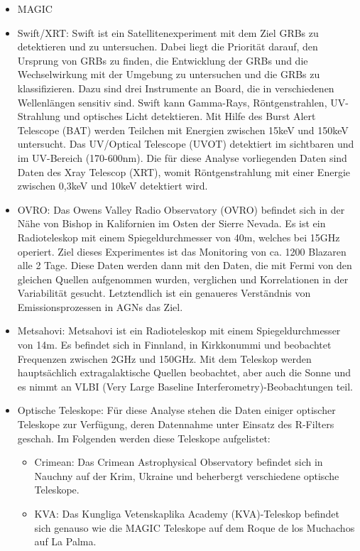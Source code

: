 \begin{itemize}
 \item MAGIC
 \item Swift/XRT: Swift ist ein Satellitenexperiment mit dem Ziel GRBs zu detektieren und zu untersuchen.
  Dabei liegt die Priorität darauf, den Ursprung von GRBs zu finden, die Entwicklung der GRBs und die Wechselwirkung mit der Umgebung zu untersuchen und die GRBs zu klassifizieren.
  Dazu sind drei Instrumente an Board, die in verschiedenen Wellenlängen sensitiv sind.
  Swift kann Gamma-Rays, Röntgenstrahlen, UV-Strahlung und optisches Licht detektieren.
  Mit Hilfe des Burst Alert Telescope (BAT) werden Teilchen mit Energien zwischen 15keV und 150keV untersucht.
  Das UV/Optical Telescope (UVOT) detektiert im sichtbaren und im UV-Bereich (170-600nm).
  Die für diese Analyse vorliegenden Daten sind Daten des Xray Telescop (XRT), womit Röntgenstrahlung mit einer Energie zwischen 0,3keV und 10keV detektiert wird.\cite{Swift}
 \item OVRO: Das Owens Valley Radio Observatory (OVRO) befindet sich in der Nähe von Bishop in Kalifornien im Osten der Sierre Nevada.
  Es ist ein Radioteleskop mit einem Spiegeldurchmesser von 40m, welches bei 15GHz operiert.
  Ziel dieses Experimentes ist das Monitoring von ca. 1200 Blazaren alle 2 Tage.
  Diese Daten werden dann mit den Daten, die mit Fermi von den gleichen Quellen aufgenommen wurden, verglichen und Korrelationen in der Variabilität gesucht.
  Letztendlich ist ein genaueres Verständnis von Emissionsprozessen in AGNs das Ziel.\cite{OVRO}
 \item Metsahovi: Metsahovi ist ein Radioteleskop mit einem Spiegeldurchmesser von 14m. 
  Es befindet sich in Finnland, in Kirkkonummi und beobachtet Frequenzen zwischen 2GHz und 150GHz.
  Mit dem Teleskop werden hauptsächlich extragalaktische Quellen beobachtet, aber auch die Sonne und es nimmt an VLBI (Very Large Baseline Interferometry)-Beobachtungen teil.\cite{Metsahovi}
 \item Optische Teleskope: Für diese Analyse stehen die Daten einiger optischer Teleskope zur Verfügung, deren Datennahme unter Einsatz des R-Filters geschah.
  Im Folgenden werden diese Teleskope aufgelistet:
 \begin{itemize}
  \item Crimean: Das Crimean Astrophysical Observatory befindet sich in Nauchny auf der Krim, Ukraine und beherbergt verschiedene optische Teleskope.\cite{Crimean}
  \item KVA: Das Kungliga Vetenskaplika Academy (KVA)-Teleskop befindet sich genauso wie die MAGIC Teleskope auf dem Roque de los Muchachos auf La Palma.

\end{itemize}
\end{itemize}
